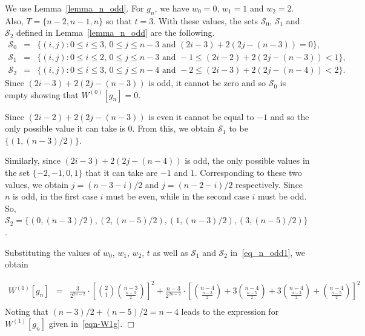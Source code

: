 \documentclass[11pt]{article}
\newenvironment{proof}{\noindent{\bf Proof:}\indent}%
                      {\hfill $\Box$\par}
\begin{document}
\begin{proof} 
	We use Lemma~\ref{lemma_n_odd}. For $g_n$, we have $w_0=0$, $w_1=1$ and $w_2=2$. Also, $T=\{n-2,n-1,n\}$ so that $t=3$. With these values, the sets $\mathcal{S}_0$, 
	$\mathcal{S}_1$ and $\mathcal{S}_2$ defined in Lemma~\ref{lemma_n_odd} are the following.
	\begin{eqnarray*}
		\mathcal{S}_{0} & = & \{(i,j): 0\leq i \leq 3 \text{, } 0\leq j \leq n-3 \text{ and } (2i-3)+2(2j-(n-3))=0\}, \\
		\mathcal{S}_{1} & = & \{(i,j): 0\leq i \leq 2 \text{, } 0\leq j \leq n-3 \text{ and } -1\leq (2i-2)+2(2j-(n-3))<1\}, \\
		\mathcal{S}_{2} & = & \{(i,j): 0\leq i \leq 3 \text{, } 0\leq j \leq n-4 \text{ and } -2\leq (2i-3)+2(2j-(n-4)) < 2\}.
	\end{eqnarray*}
	Since $(2i-3)+2(2j-(n-3))$ is odd, it cannot be zero and so $\mathcal{S}_0$ is empty showing that ${W}^{(0)}[g_n]=0$.

	Since $(2i-2)+2(2j-(n-3))$ is even it cannot be equal to $-1$ and so the only possible value it can take is 0. From this, we obtain 
	$\mathcal{S}_1$ to be $\{(1,(n-3)/2)\}$. 
	
	Similarly, since $(2i-3)+2(2j-(n-4))$ is odd, the only possible values in the set $\{-2,-1,0,1\}$ that it can take are $-1$ and $1$. Corresponding to these 
	two values, we obtain $j=(n-3-i)/2$ and $j=(n-2-i)/2$ respectively. Since $n$ is odd, in the first case $i$ must be even, while in the second case $i$ must
	be odd. So, $\mathcal{S}_2=\{(0,(n-3)/2),(2,(n-5)/2),(1,(n-3)/2),(3,(n-5)/2)\}$.

	Substituting the values of $w_0$, $w_1$, $w_2$, $t$ as well as $\mathcal{S}_1$ and $\mathcal{S}_2$ in~\eqref{eq_n_odd1}, we obtain 

	\begin{eqnarray*}
{W}^{(1)}[g_n]
		&=& \frac{3}{2^{2n-2}}\cdot \left[{2 \choose 1}{n-3\choose \frac{n-3}{2}}\right]^2 %
		+\frac{n-3}{2^{2n-2}}\cdot \left[{n-4\choose \frac{n-3}{2}}+3 {n-4\choose \frac{n-5}{2}}+3{n-4\choose \frac{n-3}{2}} +{n-4\choose \frac{n-5}{2}}\right]^2 \\
	\end{eqnarray*}
	Noting that $(n-3)/2+(n-5)/2=n-4$ leads to the expression for ${W}^{(1)}[g_n]$ given in~\eqref{eqn-W1g}.
\end{proof}
\end{document}
